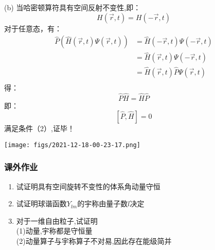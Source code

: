 \begin{frame} 
    (b) 当哈密顿算符具有空间反射不变性,即：
    $$ H(\vec{r},t)= H(-\vec{r},t)$$
    对于任意态，有：
    $$\begin{aligned}
        \hat{P} (\hat{H}(\vec{r},t) \Psi (\vec{r},t)) &= \hat{H}(-\vec{r},t) \Psi (-\vec{r},t)\\
        &= \hat{H}(\vec{r},t) \Psi (-\vec{r},t)\\
        &= \hat{H}(\vec{r},t) \hat{P} \Psi (\vec{r},t)\\
    \end{aligned}$$
    得： $$ \hat{P} \hat{H} = \hat{H} \hat{P} $$
    即：$$[\hat{P}, \hat{H}]=0$$
    满足条件（2）,证毕！
\end{frame}

\begin{frame}
    \centering
    \texttt{[image: figs/2021-12-18-00-23-17.png]} \\
\end{frame} 

\begin{frame}
    \frametitle{课外作业}
    \begin{enumerate}
        \item 试证明具有空间旋转不变性的体系角动量守恒  
        \item 试证明球谐函数$Y_{lm}$的宇称由量子数$l$决定  
        \item 对于一维自由粒子,试证明 \\
                (1)动量,宇称都是守恒量 \\
                (2)动量算子与宇称算子不对易,因此存在能级简并
    \end{enumerate}
\end{frame}

